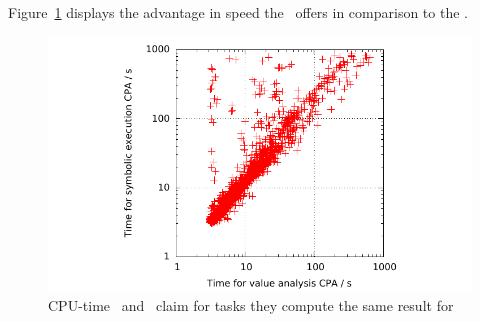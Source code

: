 Figure~\ref{fig:valCputime} displays the advantage in speed the \ offers in comparison to the \symbolicExecutionCPA.

\begin{figure}
\centering
\includegraphics[trim=2cm 0 1cm 0, clip=true, scale=0.9]{evaluation/sp_cputime_VA_symEx}
\caption{CPU-time \ and \symbolicExecutionCPA\ claim for tasks they compute the same result for}
\label{fig:valCputime}
\end{figure}
